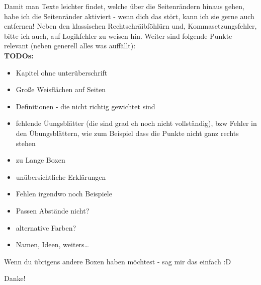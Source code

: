 {\begin{titlepage}
    Damit man Texte leichter findet, welche über die Seitenrändern hinaus gehen, habe ich die Seitenränder aktiviert - wenn dich das stört, kann ich sie gerne auch entfernen!
    Neben den klassischen Rechtschräibföhlürn und, Kommasetzungsfehler, bitte ich auch, auf Logikfehler zu weisen hin. Weiter sind folgende Punkte relevant (neben generell alles was auffällt):\\[0.25cm]
    \textbf{TODOs:}
    \begin{itemize}[label=$\square$]\setlength{\itemsep}{0pt}
        \item Kapitel ohne unterüberschrift
        \item Große Weisflächen auf Seiten
        \item Definitionen - die nicht richtig gewichtet sind
        \item fehlende Üungsblätter (die sind grad eh noch nicht vollständig), bzw Fehler in den Übungsblättern, wie zum Beispiel dass die Punkte nicht ganz rechts stehen
        \item zu Lange Boxen
        \item unübersichtliche Erklärungen
        \item Fehlen irgendwo noch Beispiele
        \item Passen Abstände nicht?
        \item alternative Farben?
        \item Namen, Ideen, weiters\ldots\\[0.25cm]
    \end{itemize}
    Wenn du übrigens andere Boxen haben möchtest - sag mir das einfach :D\\[0.5cm]
    {\par\centering\Huge Danke! \Ninja\par}
\end{titlepage} 
\newpage
}
